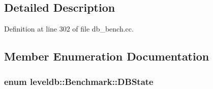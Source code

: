 \subsection{Detailed Description}


Definition at line 302 of file db\+\_\+bench.\+cc.



\subsection{Member Enumeration Documentation}
\hypertarget{classleveldb_1_1_benchmark_ad94bd817d74359a4d8cea6da609a28d4}{}
\subsubsection[{D\+B\+State}]{\setlength{\rightskip}{0pt plus 5cm}enum {\bf leveldb\+::\+Benchmark\+::\+D\+B\+State}}\label{classleveldb_1_1_benchmark_ad94bd817d74359a4d8cea6da609a28d4}
